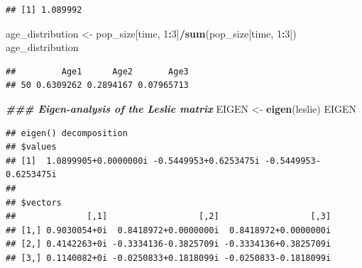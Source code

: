 \documentclass[
]{book}
\newenvironment{Shaded}{\begin{snugshade}}{\end{snugshade}}
\newcommand{\CommentTok}[1]{\textcolor[rgb]{0.56,0.35,0.01}{\textit{#1}}}
\newcommand{\DecValTok}[1]{\textcolor[rgb]{0.00,0.00,0.81}{#1}}
\newcommand{\DocumentationTok}[1]{\textcolor[rgb]{0.56,0.35,0.01}{\textbf{\textit{#1}}}}
\newcommand{\FunctionTok}[1]{\textcolor[rgb]{0.13,0.29,0.53}{\textbf{#1}}}
\newcommand{\NormalTok}[1]{#1}
\newcommand{\OtherTok}[1]{\textcolor[rgb]{0.56,0.35,0.01}{#1}}
\newcommand{\SpecialCharTok}[1]{\textcolor[rgb]{0.81,0.36,0.00}{\textbf{#1}}}
\begin{document}
\begin{Shaded}
\end{Shaded}

\begin{verbatim}
## [1] 1.089992
\end{verbatim}

\begin{Shaded}
\begin{Highlighting}[]
\NormalTok{age\_distribution }\OtherTok{\textless{}{-}}\NormalTok{ pop\_size[time, }\DecValTok{1}\SpecialCharTok{:}\DecValTok{3}\NormalTok{]}\SpecialCharTok{/}\FunctionTok{sum}\NormalTok{(pop\_size[time, }\DecValTok{1}\SpecialCharTok{:}\DecValTok{3}\NormalTok{])}
\NormalTok{age\_distribution}
\end{Highlighting}
\end{Shaded}

\begin{verbatim}
##         Age1      Age2       Age3
## 50 0.6309262 0.2894167 0.07965713
\end{verbatim}

\begin{Shaded}
\begin{Highlighting}[]
\DocumentationTok{\#\#\# Eigen{-}analysis of the Leslie matrix}
\NormalTok{EIGEN }\OtherTok{\textless{}{-}} \FunctionTok{eigen}\NormalTok{(leslie)}
\NormalTok{EIGEN}
\end{Highlighting}
\end{Shaded}

\begin{verbatim}
## eigen() decomposition
## $values
## [1]  1.0899905+0.0000000i -0.5449953+0.6253475i -0.5449953-0.6253475i
## 
## $vectors
##              [,1]                  [,2]                  [,3]
## [1,] 0.9030054+0i  0.8418972+0.0000000i  0.8418972+0.0000000i
## [2,] 0.4142263+0i -0.3334136-0.3825709i -0.3334136+0.3825709i
## [3,] 0.1140082+0i -0.0250833+0.1818099i -0.0250833-0.1818099i
\end{verbatim}

\begin{Shaded}
\end{Shaded}
\end{document}
